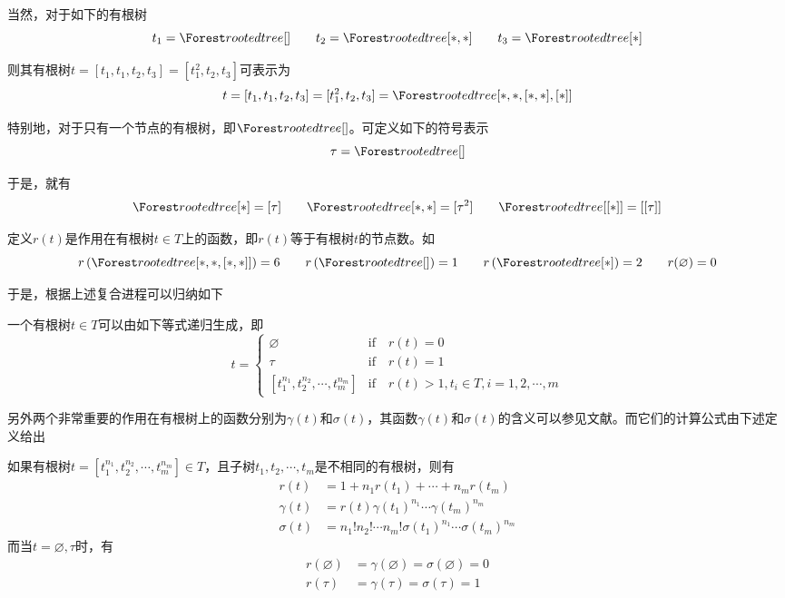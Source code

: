 当然，对于如下的有根树
\begin{equation*}
t_1=\rootedtree []\qquad t_2=\rootedtree [*,*]\qquad t_3=\rootedtree [*]
\end{equation*}

则其有根树$t=[t_1,t_1,t_2,t_3]=[t_1^2,t_2,t_3]$可表示为
\begin{equation*}
t=[t_1,t_1,t_2,t_3]=[t_1^2,t_2,t_3]=\rootedtree [*,*,[*,*],[*]]
\end{equation*}

特别地，对于只有一个节点的有根树，即$\rootedtree []$。可定义如下的符号表示
\begin{equation*}
\tau=\rootedtree []
\end{equation*}

于是，就有
\begin{equation*}
\rootedtree [*]=[\tau]\qquad \rootedtree [*,*]=[\tau^2]\qquad \rootedtree [[*]]=[[\tau]]
\end{equation*}

定义$r(t)$是作用在有根树$t\in T$上的函数，即$r(t)$等于有根树$t$的节点数。如
\begin{equation*}
r\left(\rootedtree [*,*,[*,*]]\right)=6\qquad r\left(\rootedtree []\right)=1\qquad r\left(\rootedtree [*]\right)=2\qquad r(\varnothing)=0
\end{equation*}

于是，根据上述复合进程可以归纳如下
\begin{definition}
一个有根树$t\in T$可以由如下等式递归生成，即
\begin{equation}
t=\begin{cases}
\varnothing & \text{if}\quad r(t)=0\\
\tau & \text{if}\quad r(t)=1\\
[t_1^{n_1},t_2^{n_2},\cdots,t_m^{n_m}] &\text{if}\quad r(t)>1,t_i\in T,i=1,2,\cdots,m
\end{cases}
\end{equation}
\end{definition}

另外两个非常重要的作用在有根树上的函数分别为$\gamma(t)$和$\sigma(t)$，其函数$\gamma(t)$和$\sigma(t)$的含义可以参见文献。而它们的计算公式由下述定义给出
\begin{definition}
如果有根树$t=[t_1^{n_1},t_2^{n_2},\cdots,t_m^{n_m}]\in T$，且子树$t_1,t_2,\cdots,t_m$是不相同的有根树，则有
\begin{align}
r(t)&=1+n_1r(t_1)+\cdots+n_mr(t_m)\\
\gamma(t)&=r(t)\gamma(t_1)^{n_1}\cdots\gamma(t_m)^{n_m}\\
\sigma(t)&=n_1!n_2!\cdots n_m!\sigma(t_1)^{n_1}\cdots\sigma(t_m)^{n_m}
\end{align}
而当$t=\varnothing,\tau$时，有
\begin{align*}
r(\varnothing)&=\gamma(\varnothing)=\sigma(\varnothing)=0\\
r(\tau)&=\gamma(\tau)=\sigma(\tau)=1
\end{align*}
\end{definition}

